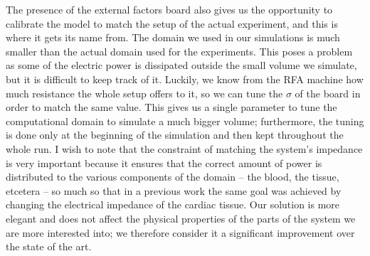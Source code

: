 The presence of the external factors board also gives us the opportunity to calibrate the model to match the setup of the actual experiment, and this is where it gets its name from.
The domain we used in our simulations is much smaller than the actual domain used for the experiments.
This poses a problem as some of the electric power is dissipated outside the small volume we simulate, but it is difficult to keep track of it.
Luckily, we know from the RFA machine how much resistance the whole setup offers to it, so we can tune the \(\sigma\) of the board in order to match the same value.
This gives us a single parameter to tune the computational domain to simulate a much bigger volume; furthermore, the tuning is done only at the beginning of the simulation and then kept throughout the whole run.
I wish to note that the constraint of matching the system's impedance is very important because it ensures that the correct amount of power is distributed to the various components of the domain -- the blood, the tissue, etcetera -- so much so that in a previous work the same goal was achieved by changing the electrical impedance of the cardiac tissue.
Our solution is more elegant and does not affect the physical properties of the parts of the system we are more interested into; we therefore consider it a significant improvement over the state of the art.

